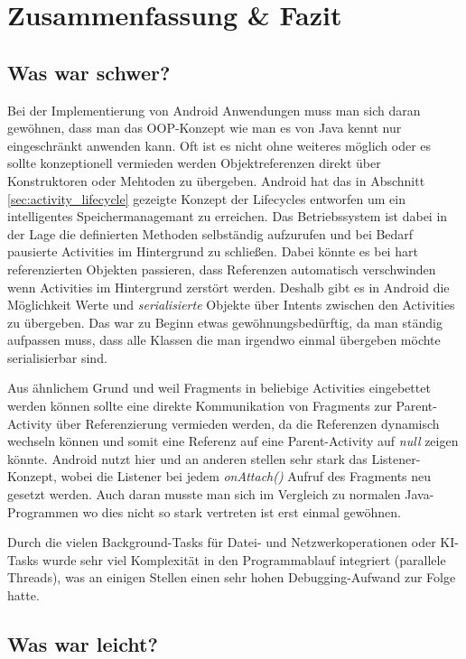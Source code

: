 \chapter{Zusammenfassung \& Fazit}
\section{Was war schwer?}

Bei der Implementierung von Android Anwendungen muss man sich daran gewöhnen, dass man das OOP-Konzept wie man es von Java kennt nur eingeschränkt anwenden kann. Oft ist es nicht ohne weiteres möglich oder es sollte konzeptionell vermieden werden Objektreferenzen direkt über Konstruktoren oder Mehtoden zu übergeben. Android hat das in Abschnitt \ref{sec:activity_lifecycle} gezeigte Konzept der Lifecycles entworfen um ein intelligentes Speichermanagemant zu erreichen. Das Betriebssystem ist dabei in der Lage die definierten Methoden selbständig aufzurufen und bei Bedarf pausierte Activities im Hintergrund zu schließen. Dabei könnte es bei hart referenzierten Objekten passieren, dass Referenzen automatisch verschwinden wenn Activities im Hintergrund zerstört werden. Deshalb gibt es in Android die Möglichkeit Werte und \emph{serialisierte} Objekte über Intents zwischen den Activities  zu übergeben. Das war zu Beginn etwas gewöhnungsbedürftig, da man ständig aufpassen muss, dass alle Klassen die man irgendwo einmal übergeben möchte serialisierbar sind.

Aus ähnlichem Grund und weil Fragments in beliebige Activities eingebettet werden können sollte eine direkte Kommunikation von Fragments zur Parent-Activity über Referenzierung vermieden werden, da die Referenzen dynamisch wechseln können und somit eine Referenz auf eine Parent-Activity auf \emph{null} zeigen könnte. Android nutzt hier und an anderen stellen sehr stark das Listener-Konzept, wobei die Listener bei jedem \emph{onAttach()} Aufruf des Fragments neu gesetzt werden. 
Auch daran musste man sich im Vergleich zu normalen Java-Programmen wo dies nicht so stark vertreten ist erst einmal gewöhnen. 

Durch die vielen Background-Tasks für Datei- und Netzwerkoperationen oder KI-Tasks wurde sehr viel Komplexität in den Programmablauf integriert (parallele Threads), was an einigen Stellen einen sehr hohen Debugging-Aufwand zur Folge hatte. 

\section{Was war leicht?}

